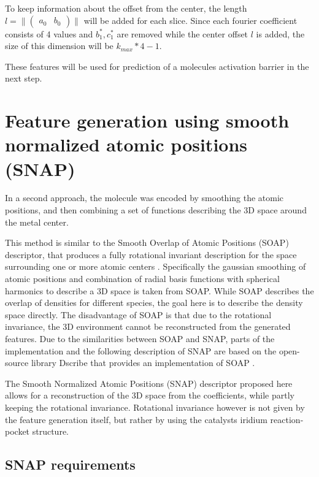 To keep information about the offset from the center, the length $l = \| \begin{pmatrix} a_0 & b_0 \end{pmatrix} \| $ will be added for each slice.
Since each fourier coefficient consists of 4 values and $b_1^*, c_1^*$ are removed while the center offset $l$ is added, the size of this dimension will be $k_{max} * 4 - 1$.

These features will be used for prediction of a molecules activation barrier in the next step.


\newpage
\section{Feature generation using smooth normalized atomic positions (SNAP)}
\label{ch:SNAP}
In a second approach, the molecule was encoded by smoothing the atomic positions, 
and then combining a set of functions describing the 3D space around the metal center.

This method is similar to the Smooth Overlap of Atomic Positions (SOAP) descriptor, that produces a 
fully rotational invariant description for the space surrounding one or more atomic centers \cite{Bart_k_2013}.
Specifically the gaussian smoothing of atomic positions and combination of radial basis functions with
spherical harmonics to describe a 3D space is taken from SOAP.
While SOAP describes the overlap of densities for different species, the goal here is to describe the density space directly.
The disadvantage of SOAP is that due to the rotational invariance, the 3D environment cannot be reconstructed from the generated features.
Due to the similarities between SOAP and SNAP, parts of the implementation and the following description of SNAP are based 
on the open-source library Dscribe that provides an implementation of SOAP \cite{dscribe}.

The Smooth Normalized Atomic Positions (SNAP) descriptor proposed here allows for a reconstruction of the 3D space from the coefficients, 
while partly keeping the rotational invariance.
Rotational invariance however is not given by the feature generation itself, but rather by using the catalysts iridium reaction-pocket structure.

\subsection{SNAP requirements}

